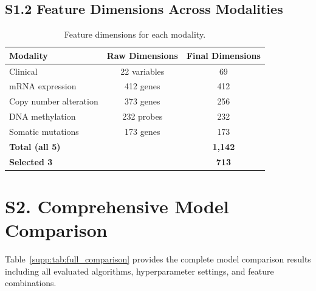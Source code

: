 \documentclass[11pt,a4paper]{article}
\begin{document}
\subsection*{S1.2 Feature Dimensions Across Modalities}

\begin{table}[H]
\centering
\caption{Feature dimensions for each modality.}
\label{supp:tab:dims}
\begin{tabular}{lcc}
\toprule
\textbf{Modality} & \textbf{Raw Dimensions} & \textbf{Final Dimensions} \\
\midrule
Clinical & 22 variables & 69 \\
mRNA expression & 412 genes & 412 \\
Copy number alteration & 373 genes & 256 \\
DNA methylation & 232 probes & 232 \\
Somatic mutations & 173 genes & 173 \\
\midrule
\textbf{Total (all 5)} & & \textbf{1,142} \\
\textbf{Selected 3} & & \textbf{713} \\
\bottomrule
\end{tabular}
\end{table}

\section*{S2. Comprehensive Model Comparison}
\label{supp:tab:all_models}

Table~\ref{supp:tab:full_comparison} provides the complete model comparison results including all evaluated algorithms, hyperparameter settings, and feature combinations.
\end{document}

